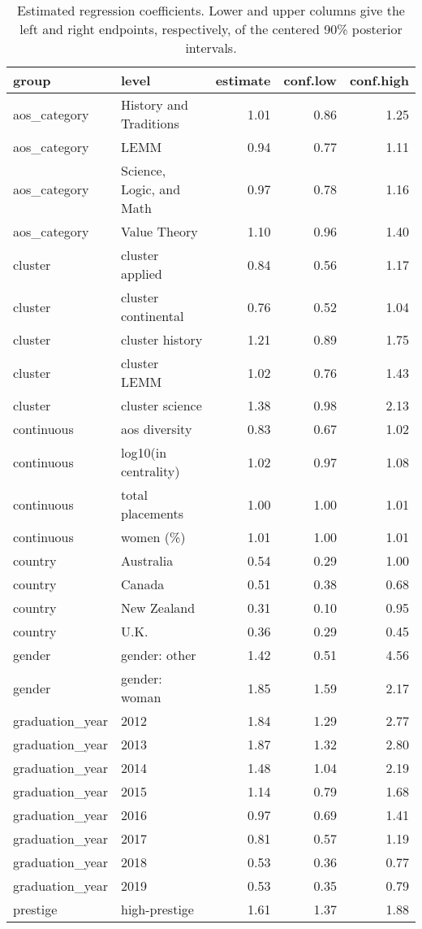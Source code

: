 \begin{table}

\caption{\label{tab:estimates}Estimated regression coefficients.  Lower and upper columns give the left and right endpoints, respectively, of the centered 90\% posterior intervals.}
\centering
\begin{tabular}[t]{llrrr}
\toprule
group & level & estimate & conf.low & conf.high\\
\midrule
aos\_category & History and Traditions & 1.01 & 0.86 & 1.25\\
aos\_category & LEMM & 0.94 & 0.77 & 1.11\\
aos\_category & Science, Logic, and Math & 0.97 & 0.78 & 1.16\\
aos\_category & Value Theory & 1.10 & 0.96 & 1.40\\
cluster & cluster applied & 0.84 & 0.56 & 1.17\\
\addlinespace
cluster & cluster continental & 0.76 & 0.52 & 1.04\\
cluster & cluster history & 1.21 & 0.89 & 1.75\\
cluster & cluster LEMM & 1.02 & 0.76 & 1.43\\
cluster & cluster science & 1.38 & 0.98 & 2.13\\
continuous & aos diversity & 0.83 & 0.67 & 1.02\\
\addlinespace
continuous & log10(in centrality) & 1.02 & 0.97 & 1.08\\
continuous & total placements & 1.00 & 1.00 & 1.01\\
continuous & women (\%) & 1.01 & 1.00 & 1.01\\
country & Australia & 0.54 & 0.29 & 1.00\\
country & Canada & 0.51 & 0.38 & 0.68\\
\addlinespace
country & New Zealand & 0.31 & 0.10 & 0.95\\
country & U.K. & 0.36 & 0.29 & 0.45\\
gender & gender: other & 1.42 & 0.51 & 4.56\\
gender & gender: woman & 1.85 & 1.59 & 2.17\\
graduation\_year & 2012 & 1.84 & 1.29 & 2.77\\
\addlinespace
graduation\_year & 2013 & 1.87 & 1.32 & 2.80\\
graduation\_year & 2014 & 1.48 & 1.04 & 2.19\\
graduation\_year & 2015 & 1.14 & 0.79 & 1.68\\
graduation\_year & 2016 & 0.97 & 0.69 & 1.41\\
graduation\_year & 2017 & 0.81 & 0.57 & 1.19\\
\addlinespace
graduation\_year & 2018 & 0.53 & 0.36 & 0.77\\
graduation\_year & 2019 & 0.53 & 0.35 & 0.79\\
prestige & high-prestige & 1.61 & 1.37 & 1.88\\
\bottomrule
\end{tabular}
\end{table}